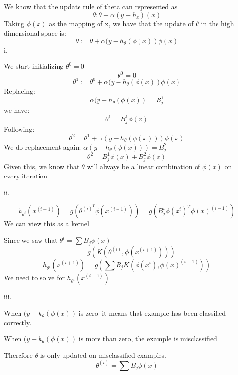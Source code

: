 \begin{answer}

We know that the update rule of theta can represented as:
\[\theta : \theta + \alpha(y - h_x) (x)\]
Taking $\phi(x)$ as the mapping of x, we have that the update of $\theta$ in the high dimensional space is:
\[\theta := \theta + \alpha(y - h_{\theta} (\phi(x)) \phi(x) \]
i. 

We start initializing $\theta^0 = 0$
\[\theta^0 = 0 \]
\[\theta^1 := \theta^0 + \alpha(y - h_{\theta} (\phi(x)) \phi(x) \]
Replacing:
\[\alpha(y - h_{\theta} (\phi(x)) = B_j^1 \]
we have:
\[\theta^1 = B_j^1 \phi(x) \]
Following:
\[\theta^2 = \theta^1 + \alpha(y - h_{\theta} (\phi(x))) \phi(x) \]
We do replacement again: $\alpha(y - h_{\theta} (\phi(x))) = B_j^2$
\[\theta^2 = B_j^1 \phi(x) + B_j^2 \phi(x) \]
Given this, we know that $\theta$ will always be a linear combination of $\phi(x)$ on every iteration


ii. 

\[h_{\theta^i}(x^{(i+1)}) = g(\theta^{(i)}^T \phi(x^{(i+1)})) = g(B_j^i \phi(x^i)^T\phi(x)^{(i+1)}) \]
We can view this as a kernel

Since we saw that $\theta^{i} = \sum B_j \phi(x)$
\[ = g(K(\theta^{(i)},\phi(x^{(i+1)}))) \]
\[ h_{\theta^i}(x^{(i+1)}) = g(\sum{B_j} K(\phi(x^i), \phi(x)^{(i+1)}))\]
We need to solve for $h_{\theta^i}(x^{(i+1)})$

iii.

When $(y- h_{\theta}(\phi(x))$  is zero, it means that example has been classified correctly.

When $(y- h_{\theta}(\phi(x))$ is more than zero, the example is misclassified.

Therefore $\theta$ is only updated on misclassified examples.
 \[ \theta^{(i)} = \sum B_j\phi(x) \]
 
 

\end{answer}
